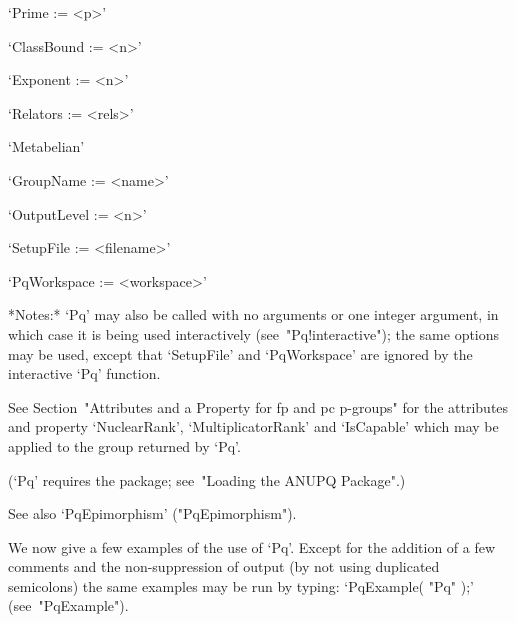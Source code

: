 \beginlist%

\item{}`Prime := <p>'

\item{}`ClassBound := <n>'

\item{}`Exponent := <n>'

\item{}`Relators := <rels>'

\item{}`Metabelian'

\item{}`GroupName := <name>'

\item{}`OutputLevel := <n>'

\item{}`SetupFile := <filename>'

\item{}`PqWorkspace := <workspace>'

\endlist

*Notes:* `Pq' may also  be  called  with  no  arguments  or  one  integer
argument,   in   which   case   it   is    being    used    interactively
(see~"Pq!interactive");  the  same  options  may  be  used,  except  that
`SetupFile'  and  `PqWorkspace'  are  ignored  by  the  interactive  `Pq'
function.

See Section~"Attributes and a Property for fp and pc  p-groups"  for  the
attributes   and   property   `NuclearRank',   `MultiplicatorRank'    and
`IsCapable' which may be applied to the group returned by `Pq'.

(`Pq' requires the {\ANUPQ} package; see~"Loading the ANUPQ Package".)

See also `PqEpimorphism' ("PqEpimorphism").

We now give a few examples of the use of `Pq'. Except for the addition of
a few comments and the non-suppression of output (by not using duplicated
semicolons) the same examples may be run by typing: `PqExample( "Pq"  );'
(see~"PqExample").

